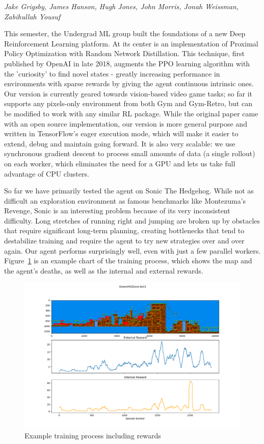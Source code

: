 \emph{Jake Grigsby, James Hanson, Hugh Jones, John Morris, Jonah Weissman, Zabihullah Yousuf}
\bigskip


This semester, the Undergrad ML group built the foundations of a new Deep Reinforcement Learning platform. At its center is an implementation of Proximal Policy Optimization with Random Network Distillation. This technique, first published by OpenAI in late 2018, augments the PPO learning algorithm with the 'curiosity' to find novel states - greatly increasing performance in environments with sparse rewards by giving the agent continuous intrinsic ones. Our version is currently geared towards vision-based video game tasks; so far it supports any pixels-only environment from both Gym and Gym-Retro, but can be modified to work with any similar RL package. While the original paper came with an open source implementation, our version is more general purpose and written in TensorFlow's eager execution mode, which will make it easier to extend, debug and maintain going forward. It is also very scalable: we use synchronous gradient descent to process small amounts of data (a single rollout) on each worker, which eliminates the need for a GPU and lets us take full advantage of CPU clusters.

So far we have primarily tested the agent on Sonic The Hedgehog. While not as difficult an exploration environment as famous benchmarks like Montezuma's Revenge, Sonic is an interesting problem because of its very inconsistent difficulty. Long stretches of running right and jumping are broken up by obstacles that require significant long-term planning, creating bottlenecks that tend to destabilize training and require the agent to try new strategies over and over again. Our agent performs surprisingly well, even with just a few parallel workers. Figure~\ref{fig:mlunder} is an example chart of the training process, which shows the map and the agent's deaths, as well as the internal and external rewards.

\begin{figure}[!hbtp]
\includegraphics[width=\textwidth]{images/mlunder_figure.png}
\caption[Deep Reinforcement Learning rewards]{Example training process including rewards}
\label{fig:mlunder}
\end{figure}





